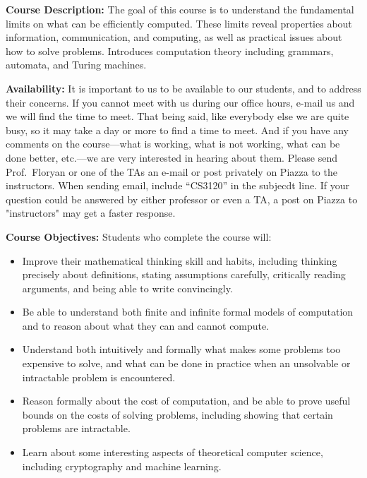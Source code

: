 \documentclass[12pt]{article}
\begin{document}
\textbf{Course Description:} The goal of this course is to understand the fundamental limits on what can be efficiently computed. These limits reveal properties about information, communication, and computing, as well as practical issues about how to solve problems. Introduces computation theory including grammars, automata, and Turing machines.

\textbf{Availability:} It is important to us to be available to our students, and to address their concerns.  If you cannot meet with us during our office hours, e-mail us and we will find the time to meet. That being said, like everybody else we are quite busy, so it may take a day or more to find a time to meet. And if you have any comments on the course---what is working, what is not working, what can be done better, etc.---we are very interested in hearing about them.  Please send Prof.\ Floryan or one of the TAs an e-mail or post privately on Piazza to the instructors.  When sending email, include ``CS3120'' in the subjecdt line. If your question could be answered by either professor or even a TA, a post on Piazza to "instructors" may get a faster response.


\textbf{Course Objectives:} Students who complete the course will:
\begin{itemize}
    \item Improve their mathematical thinking skill and habits, including thinking precisely about definitions, stating assumptions carefully, critically reading arguments, and being able to write convincingly.

    \item Be able to understand both finite and infinite formal models of computation and to reason about what they can and cannot compute.

    \item Understand both intuitively and formally what makes some problems too expensive to solve, and what can be done in practice when an unsolvable or intractable problem is encountered.

    \item Reason formally about the cost of computation, and be able to prove useful bounds on the costs of solving problems, including showing that certain problems are intractable.

    \item Learn about some interesting aspects of theoretical computer science, including cryptography and machine learning.
\end{itemize}
\end{document}
